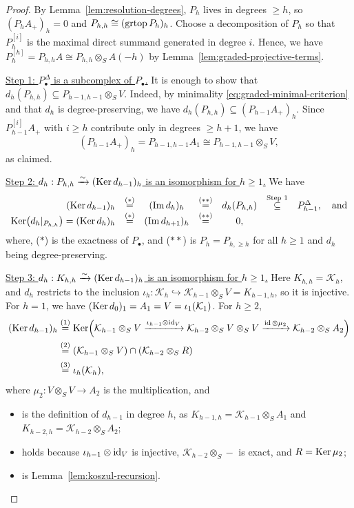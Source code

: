 \begin{proof}
By Lemma~\ref{lem:resolution-degrees}, $P_h$ lives in degrees $\geq h$, so $(P_hA_+)_h=0$ and $P_{h,h}\cong(\operatorname{grtop}\nolimits P_h)_h$.
Choose a decomposition of $P_h$ so that $P_h^{[i]}$ is the maximal direct summand generated in degree $i$.  Hence, we have $P_h^{[h]}=P_{h,h}A\cong P_{h,h}\otimes_SA(-h)$ by Lemma~\ref{lem:graded-projective-terms}.

\underline{Step 1: $P^\Delta_\bullet$ is a subcomplex of $P_\bullet$.}  It is enough to show that $d_h(P_{h,h})\subseteq P_{h-1,h-1}\otimes_SV$.  Indeed,
by minimality \eqref{eq:graded-minimal-criterion} and that $d_h$ is degree-preserving, we have $d_h(P_{h,h})\subseteq (P_{h-1}A_+)_h$.
Since $P_{h-1}^{[i]}A_+$ with $i\geq h$ contribute only in degrees $\geq h+1$, we have  \[(P_{h-1}A_+)_h=P_{h-1,h-1}A_1\cong P_{h-1,h-1}\otimes_S V,\]
as claimed.

\underline{Step 2: $d_h:P_{h,h}\xrightarrow{\sim}(\operatorname{Ker}\nolimits d_{h-1})_h$ is an isomorphism for $h\geq1$.}
We have
\[
\begin{array}{rcccccl}
(\operatorname{Ker}\nolimits d_{h-1})_h & \stackrel{(\ast)}{=}& (\operatorname{Im}\nolimits d_h)_h &\stackrel{(\ast\ast)}{=} & d_h(P_{h,h}) &\stackrel{\text{Step 1}}{\subseteq}& P_{h-1}^{\Delta}, \quad \text{and}\\
\operatorname{Ker}\nolimits\bigl(d_h|_{P_{h,h}}\bigr) =(\operatorname{Ker}\nolimits d_h)_h & \stackrel{(\ast)}{=} & (\operatorname{Im}\nolimits d_{h+1})_h&\stackrel{(\ast\ast)}{=}&0,
\end{array}
\]
where, ($\ast$) is the exactness of $P_\bullet$, and ($\ast\ast$) is 
 $P_h=P_{h,\ge h}$ for all $h\ge 1$ and $d_h$ being degree-preserving.

\underline{Step 3: $d_h:K_{h,h}\xrightarrow{\sim}(\operatorname{Ker}\nolimits d_{h-1})_h$ is an isomorphism for $h\geq1$.}
Here $K_{h,h}=\mathcal K_h$, and $d_h$ restricts to the inclusion $\iota_h:\mathcal K_h\hookrightarrow\mathcal K_{h-1}\otimes_SV=K_{h-1,h}$, so it is injective.
For $h=1$, we have $(\operatorname{Ker}\nolimits d_0)_1=A_1=V=\iota_1(\mathcal K_1)$.
For $h\geq2$,
\[
\begin{aligned}
(\operatorname{Ker}\nolimits d_{h-1})_h&\stackrel{(1)}{=}\operatorname{Ker}\nolimits\Bigl(\mathcal K_{h-1}\otimes_SV\xrightarrow{\iota_{h-1}\otimes\operatorname{id}_V}\mathcal K_{h-2}\otimes_SV\otimes_SV\xrightarrow{\operatorname{id}\otimes\mu_2}\mathcal K_{h-2}\otimes_SA_2\Bigr)\\
&\stackrel{(2)}{=}(\mathcal K_{h-1}\otimes_SV)\cap(\mathcal K_{h-2}\otimes_SR)\\
&\stackrel{(3)}{=}\iota_h(\mathcal K_h),
\end{aligned}
\]
where $\mu_2:V\otimes_SV\to A_2$ is the multiplication, and
\begin{itemize}
\item[(1)] is the definition of $d_{h-1}$ in degree $h$, as $K_{h-1,h}=\mathcal K_{h-1}\otimes_SA_1$ and $K_{h-2,h}=\mathcal K_{h-2}\otimes_SA_2$;
\item[(2)] holds because $\iota_{h-1}\otimes\operatorname{id}_V$ is injective, $\mathcal K_{h-2}\otimes_S-$ is exact, and $R=\operatorname{Ker}\nolimits\mu_2$;
\item[(3)] is Lemma~\ref{lem:koszul-recursion}.
\end{itemize}


\end{proof}
